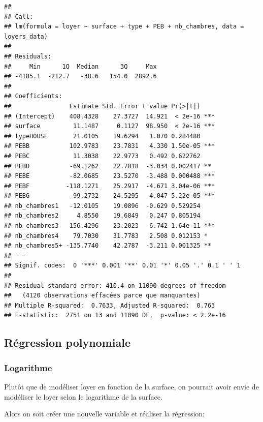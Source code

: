 \documentclass[
]{book}
\newenvironment{Shaded}{\begin{snugshade}}{\end{snugshade}}
\newcommand{\AttributeTok}[1]{\textcolor[rgb]{0.13,0.29,0.53}{#1}}
\newcommand{\FunctionTok}[1]{\textcolor[rgb]{0.13,0.29,0.53}{\textbf{#1}}}
\newcommand{\NormalTok}[1]{#1}
\newcommand{\OtherTok}[1]{\textcolor[rgb]{0.56,0.35,0.01}{#1}}
\newcommand{\SpecialCharTok}[1]{\textcolor[rgb]{0.81,0.36,0.00}{\textbf{#1}}}
\begin{document}
\begin{verbatim}
## 
## Call:
## lm(formula = loyer ~ surface + type + PEB + nb_chambres, data = loyers_data)
## 
## Residuals:
##     Min      1Q  Median      3Q     Max 
## -4185.1  -212.7   -38.6   154.0  2892.6 
## 
## Coefficients:
##                Estimate Std. Error t value Pr(>|t|)    
## (Intercept)    408.4328    27.3727  14.921  < 2e-16 ***
## surface         11.1487     0.1127  98.950  < 2e-16 ***
## typeHOUSE       21.0105    19.6294   1.070 0.284480    
## PEBB           102.9783    23.7831   4.330 1.50e-05 ***
## PEBC            11.3038    22.9773   0.492 0.622762    
## PEBD           -69.1262    22.7818  -3.034 0.002417 ** 
## PEBE           -82.0685    23.5270  -3.488 0.000488 ***
## PEBF          -118.1271    25.2917  -4.671 3.04e-06 ***
## PEBG           -99.2732    24.5295  -4.047 5.22e-05 ***
## nb_chambres1   -12.0105    19.0896  -0.629 0.529254    
## nb_chambres2     4.8550    19.6849   0.247 0.805194    
## nb_chambres3   156.4296    23.2023   6.742 1.64e-11 ***
## nb_chambres4    79.7030    31.7783   2.508 0.012153 *  
## nb_chambres5+ -135.7740    42.2787  -3.211 0.001325 ** 
## ---
## Signif. codes:  0 '***' 0.001 '**' 0.01 '*' 0.05 '.' 0.1 ' ' 1
## 
## Residual standard error: 410.4 on 11090 degrees of freedom
##   (4120 observations effacées parce que manquantes)
## Multiple R-squared:  0.7633, Adjusted R-squared:  0.763 
## F-statistic:  2751 on 13 and 11090 DF,  p-value: < 2.2e-16
\end{verbatim}

\hypertarget{ruxe9gression-polynomiale}{%
\subsection{Régression polynomiale}\label{ruxe9gression-polynomiale}}

\hypertarget{logarithme}{%
\subsubsection{Logarithme}\label{logarithme}}

Plutôt que de modéliser loyer en fonction de la surface, on pourrait
avoir envie de modéliser le loyer selon le logarithme de la surface.

Alors on soit créer une nouvelle variable et réaliser la régression:

\begin{Shaded}
\end{Shaded}
\end{document}
